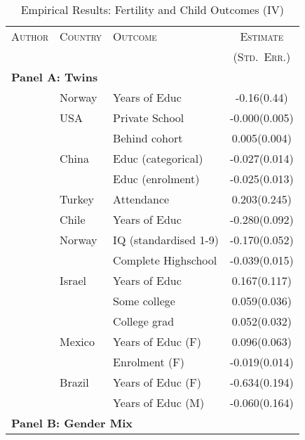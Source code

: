 \documentclass{article}
\begin{document}
\begin{spacing}{1.4}
\begin{table}[htpb!]
\caption{Empirical Results: Fertility and Child Outcomes (IV)}
\label{Ftab:childQQ}
\begin{tabular}{lllc} \toprule
\textsc{Author} & \textsc{Country} & \textsc{Outcome} & \textsc{Estimate} \\
                &                  &                  & \textsc{(Std.\ Err.)} \\ \midrule
\multicolumn{4}{l}{\textbf{Panel A: Twins}} \\
\citet{Blacketal2005}            &Norway   &Years of Educ        &-0.16(0.44) \\
\citet{Caceres2006}              &USA      &Private School       &-0.000(0.005)\\
                                 &         &Behind cohort        & 0.005(0.004)\\
\citet{Lietal2008}               &China    &Educ (categorical)   &-0.027(0.014)\\
                                 &         &Educ (enrolment)    &-0.025(0.013)\\
\citet{Dayiogluetal2009}         &Turkey   &Attendance           & 0.203(0.245)\\
\citet{Sanhueza2009}             &Chile    &Years of Educ        &-0.280(0.092)\\
\citet{Blacketal2010}            &Norway   &IQ (standardised 1-9)&-0.170(0.052)\\
                                 &         &Complete Highschool  &-0.039(0.015)\\
\citet{Angristetal2010}          &Israel   &Years of Educ        & 0.167(0.117)\\
                                 &         &Some college         & 0.059(0.036)\\
                                 &         &College grad         & 0.052(0.032)\\
\citet{FitzsimonsMalde2010}      &Mexico   &Years of Educ (F)    & 0.096(0.063)\\
                                 &         &Enrolment (F)        &-0.019(0.014)\\
\citet{SouzaPonczek2012}         &Brazil   &Years of Educ (F)    &-0.634(0.194)\\
                                 &         &Years of Educ (M)    &-0.060(0.164)\\ \midrule
\multicolumn{4}{l}{\textbf{Panel B: Gender Mix}} \\

\end{tabular}
\end{table}
\end{spacing}
\end{document}
